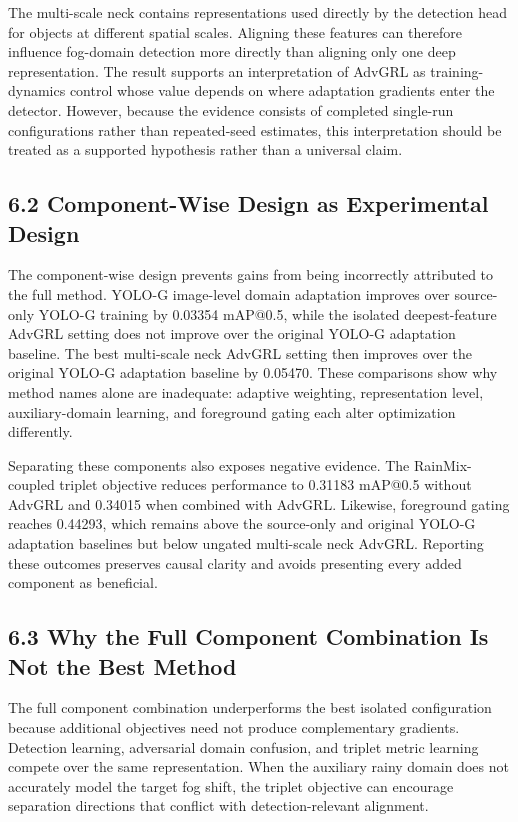\documentclass[
  11pt,
]{article}
\begin{document}
The multi-scale neck contains representations used directly by the
detection head for objects at different spatial scales. Aligning these
features can therefore influence fog-domain detection more directly than
aligning only one deep representation. The result supports an
interpretation of AdvGRL as training-dynamics control whose value
depends on where adaptation gradients enter the detector. However,
because the evidence consists of completed single-run configurations
rather than repeated-seed estimates, this interpretation should be
treated as a supported hypothesis rather than a universal claim.

\hypertarget{component-wise-design-as-experimental-design}{%
\subsection{6.2 Component-Wise Design as Experimental
Design}\label{component-wise-design-as-experimental-design}}

The component-wise design prevents gains from being incorrectly
attributed to the full method. YOLO-G image-level domain adaptation
improves over source-only YOLO-G training by 0.03354 mAP@0.5, while the
isolated deepest-feature AdvGRL setting does not improve over the
original YOLO-G adaptation baseline. The best multi-scale neck AdvGRL
setting then improves over the original YOLO-G adaptation baseline by
0.05470. These comparisons show why method names alone are inadequate:
adaptive weighting, representation level, auxiliary-domain learning, and
foreground gating each alter optimization differently.

Separating these components also exposes negative evidence. The
RainMix-coupled triplet objective reduces performance to 0.31183 mAP@0.5
without AdvGRL and 0.34015 when combined with AdvGRL. Likewise,
foreground gating reaches 0.44293, which remains above the source-only
and original YOLO-G adaptation baselines but below ungated multi-scale
neck AdvGRL. Reporting these outcomes preserves causal clarity and
avoids presenting every added component as beneficial.

\hypertarget{why-the-full-component-combination-is-not-the-best-method}{%
\subsection{6.3 Why the Full Component Combination Is Not the Best
Method}\label{why-the-full-component-combination-is-not-the-best-method}}

The full component combination underperforms the best isolated
configuration because additional objectives need not produce
complementary gradients. Detection learning, adversarial domain
confusion, and triplet metric learning compete over the same
representation. When the auxiliary rainy domain does not accurately
model the target fog shift, the triplet objective can encourage
separation directions that conflict with detection-relevant alignment.
\end{document}
